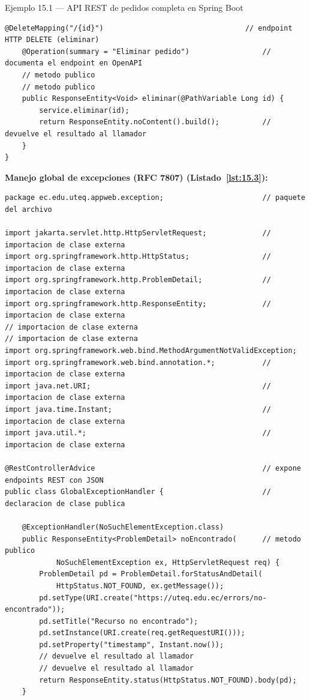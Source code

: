 \documentclass[11pt,a4paper,openany]{book}
\begin{document}
\begin{cajaejemplo}{Ejemplo 15.1 --- API REST de pedidos completa en Spring Boot}
\begin{lstlisting}[style=java,caption={PedidoController.java},label=lst:15.2]
    @DeleteMapping("/{id}")                                 // endpoint HTTP DELETE (eliminar)
    @Operation(summary = "Eliminar pedido")                 // documenta el endpoint en OpenAPI
    // metodo publico
    // metodo publico
    public ResponseEntity<Void> eliminar(@PathVariable Long id) {
        service.eliminar(id);
        return ResponseEntity.noContent().build();          // devuelve el resultado al llamador
    }
}
\end{lstlisting}

\textbf{Manejo global de excepciones (RFC 7807) (Listado~\ref{lst:15.3}):}
\begin{lstlisting}[style=java,caption={GlobalExceptionHandler.java},label=lst:15.3]
package ec.edu.uteq.appweb.exception;                       // paquete del archivo

import jakarta.servlet.http.HttpServletRequest;             // importacion de clase externa
import org.springframework.http.HttpStatus;                 // importacion de clase externa
import org.springframework.http.ProblemDetail;              // importacion de clase externa
import org.springframework.http.ResponseEntity;             // importacion de clase externa
// importacion de clase externa
// importacion de clase externa
import org.springframework.web.bind.MethodArgumentNotValidException;
import org.springframework.web.bind.annotation.*;           // importacion de clase externa
import java.net.URI;                                        // importacion de clase externa
import java.time.Instant;                                   // importacion de clase externa
import java.util.*;                                         // importacion de clase externa

@RestControllerAdvice                                       // expone endpoints REST con JSON
public class GlobalExceptionHandler {                       // declaracion de clase publica

    @ExceptionHandler(NoSuchElementException.class)
    public ResponseEntity<ProblemDetail> noEncontrado(      // metodo publico
            NoSuchElementException ex, HttpServletRequest req) {
        ProblemDetail pd = ProblemDetail.forStatusAndDetail(
            HttpStatus.NOT_FOUND, ex.getMessage());
        pd.setType(URI.create("https://uteq.edu.ec/errors/no-encontrado"));
        pd.setTitle("Recurso no encontrado");
        pd.setInstance(URI.create(req.getRequestURI()));
        pd.setProperty("timestamp", Instant.now());
        // devuelve el resultado al llamador
        // devuelve el resultado al llamador
        return ResponseEntity.status(HttpStatus.NOT_FOUND).body(pd);
    }


\end{lstlisting}
\end{cajaejemplo}
\end{document}
